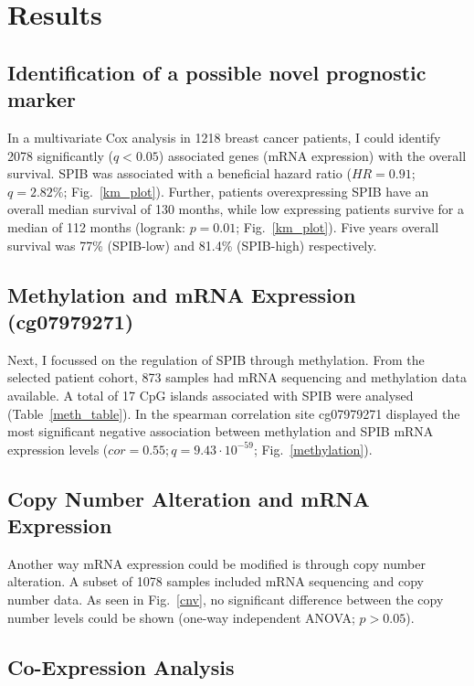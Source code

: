 \section{Results}
\countem

\subsection{Identification of a possible novel prognostic marker}

In a multivariate Cox analysis in 1218 breast cancer patients, I could identify 2078 significantly ($q < 0.05$) associated genes (mRNA expression) with the overall survival.
SPIB was associated with a beneficial hazard ratio ($HR = 0.91$; $q= 2.82\%$; Fig.~\ref{km_plot}).
Further, patients overexpressing SPIB have an overall median survival of 130 months, while low expressing patients survive for a median of 112 months (logrank: $p = 0.01$; Fig.~\ref{km_plot}).
Five years overall survival was 77\% (SPIB-low) and 81.4\% (SPIB-high) respectively. 

\subsection{Methylation and mRNA Expression (cg07979271)}

Next, I focussed on the regulation of SPIB through methylation.
From the selected patient cohort, 873 samples had mRNA sequencing and methylation data available.  
A total of 17 CpG islands associated with SPIB were analysed (Table~\ref{meth_table}).
In the spearman correlation site cg07979271 displayed the most significant negative association between methylation and SPIB mRNA expression levels ($cor = 0.55; q = 9.43 \cdot 10^{-59}$; Fig.~\ref{methylation}).

\subsection{Copy Number Alteration and mRNA Expression}

Another way mRNA expression could be modified is through copy number alteration.
A subset of 1078 samples included mRNA sequencing and copy number data.
As seen in Fig.~\ref{cnv}, no significant difference between the copy number levels could be shown (one-way independent ANOVA; $p > 0.05$).

\subsection{Co-Expression Analysis}

